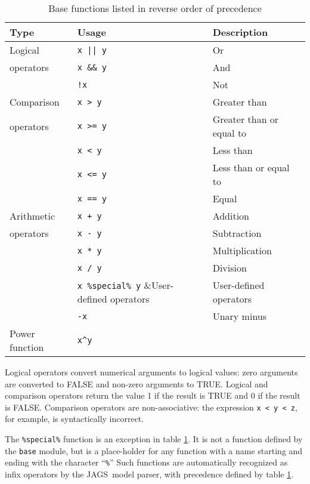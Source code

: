 \documentclass[11pt, a4paper, titlepage]{report}
\newcommand{\JAGS}{\textsf{JAGS}}
\begin{document}
\begin{table}[h]
\begin{center}
\begin{tabular}{lll}
\hline
Type & Usage & Description\\ 
\hline
Logical           & \verb+x || y+ & Or \\
operators         & \verb+x && y+ & And \\
                  & \verb+!x+     & Not \\
\hline
Comparison  & \verb+x > y+ & Greater than\\
operators   & \verb+x >= y+ & Greater than or equal to  \\
            & \verb+x < y+ & Less than \\
            & \verb+x <= y+ & Less than or equal to \\
            & \verb+x == y+ & Equal \\
\hline
Arithmetic  & \verb-x + y- & Addition \\
operators   & \verb+x - y+ & Subtraction\\
            & \verb+x * y+ & Multiplication \\
            & \verb+x / y+ & Division \\
            & \verb+x %special% y+ &User-defined operators\\
            & \verb+-x+ & Unary minus\\
\hline
Power function & \verb+x^y+ & \\
\hline
\end{tabular}
\caption{Base functions listed in reverse order of precedence 
  \label{table:base:functions}}
\end{center}
\end{table}

Logical operators convert numerical arguments to logical values: zero
arguments are converted to FALSE and non-zero arguments to
TRUE. Logical and comparison operators return the value 1 if the
result is TRUE and 0 if the result is FALSE.  Comparison operators are
non-associative: the expression \verb+x < y < z+, for example, is
syntactically incorrect.

The \verb+%special%+ function is an exception in table
\ref{table:base:functions}. It is not a function defined by the
\verb+base+ module, but is a place-holder for any function
with a name starting and ending with the character ``\verb+%+'' Such
functions are automatically recognized as infix operators by the
\JAGS\ model parser, with precedence defined by table
\ref{table:base:functions}.
\end{document}
